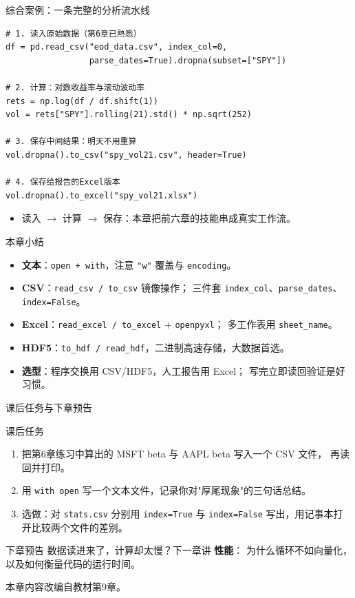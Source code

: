 \documentclass[9pt]{ctexbeamer}
\begin{document}
\begin{frame}[fragile]{综合案例：一条完整的分析流水线}
	\begin{lstlisting}
# 1. 读入原始数据（第6章已熟悉）
df = pd.read_csv("eod_data.csv", index_col=0,
                 parse_dates=True).dropna(subset=["SPY"])

# 2. 计算：对数收益率与滚动波动率
rets = np.log(df / df.shift(1))
vol = rets["SPY"].rolling(21).std() * np.sqrt(252)

# 3. 保存中间结果：明天不用重算
vol.dropna().to_csv("spy_vol21.csv", header=True)

# 4. 保存给报告的Excel版本
vol.dropna().to_excel("spy_vol21.xlsx")
\end{lstlisting}
	\begin{itemize}
		\item 读入 $\to$ 计算 $\to$ 保存：本章把前六章的技能串成真实工作流。
	\end{itemize}
\end{frame}

\begin{frame}{本章小结}
	\begin{itemize}
		\item \textbf{文本}：\texttt{open + with}，注意 \texttt{"w"} 覆盖与 \texttt{encoding}。
		\item \textbf{CSV}：\texttt{read\_csv / to\_csv} 镜像操作；
			三件套 \texttt{index\_col}、\texttt{parse\_dates}、\texttt{index=False}。
		\item \textbf{Excel}：\texttt{read\_excel / to\_excel} + \texttt{openpyxl}；
			多工作表用 \texttt{sheet\_name}。
		\item \textbf{HDF5}：\texttt{to\_hdf / read\_hdf}，二进制高速存储，大数据首选。
		\item \textbf{选型}：程序交换用 CSV/HDF5，人工报告用 Excel；
			写完立即读回验证是好习惯。
	\end{itemize}
\end{frame}

\begin{frame}{课后任务与下章预告}
	\begin{block}{课后任务}
		\begin{enumerate}
			\item 把第6章练习中算出的 MSFT beta 与 AAPL beta 写入一个 CSV 文件，
				再读回并打印。
			\item 用 \texttt{with open} 写一个文本文件，记录你对"厚尾现象"的三句话总结。
			\item 选做：对 \texttt{stats.csv} 分别用 \texttt{index=True} 与
				\texttt{index=False} 写出，用记事本打开比较两个文件的差别。
		\end{enumerate}
	\end{block}
	\begin{exampleblock}{下章预告}
		数据读进来了，计算却太慢？下一章讲 \textbf{性能}：
		为什么循环不如向量化，以及如何衡量代码的运行时间。
	\end{exampleblock}
	\begin{center}
		\vspace{0.5em}
		本章内容改编自教材第9章\citep{hilpisch2018python}。
	\end{center}
\end{frame}
\end{document}
